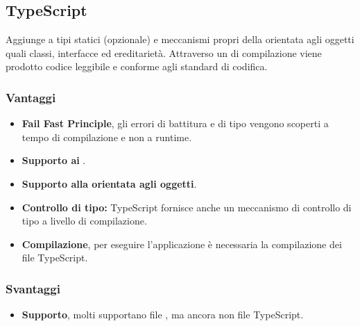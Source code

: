 \subsection{TypeScript}
Aggiunge a  tipi statici (opzionale) e meccanismi propri della  orientata agli oggetti quali classi, interfacce ed ereditariet\`a. Attraverso un  di compilazione viene prodotto codice  leggibile e conforme agli standard di codifica. 
\subsubsection{Vantaggi}
\begin{itemize}
\item \textbf{Fail Fast Principle}, gli errori di battitura e di tipo vengono scoperti a tempo di compilazione e non a runtime.
\item \textbf{Supporto ai }.
\item \textbf{Supporto alla  orientata agli oggetti}.
\item \textbf{Controllo di tipo:} TypeScript fornisce anche un meccanismo di controllo di tipo a livello di compilazione.
\item \textbf{Compilazione}, per eseguire l'applicazione \`e necessaria la compilazione dei file TypeScript.
\end{itemize}
\subsubsection{Svantaggi}
\begin{itemize}
\item \textbf{Supporto}, molti  supportano file , ma ancora non file TypeScript.
\end{itemize}
